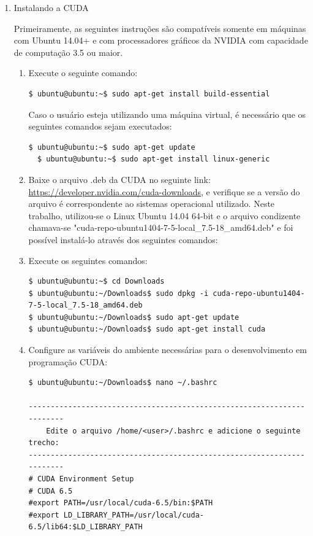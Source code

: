\begin{enumerate}
 \item Instalando a CUDA
 
 Primeiramente, as seguintes instruções são compatíveis somente em máquinas com Ubuntu 14.04+ e com processadores gráficos da NVIDIA com capacidade de computação 3.5 ou maior. 
 \begin{enumerate}
  \item  Execute o seguinte comando:
  
\begin{lstlisting}[basicstyle=\tiny]
  $ ubuntu@ubuntu:~$ sudo apt-­get install build­-essential
\end{lstlisting}
  
Caso o usuário esteja utilizando uma máquina virtual, é necessário que os seguintes comandos sejam executados:

\begin{lstlisting}[basicstyle=\tiny]
  $ ubuntu@ubuntu:~$ sudo apt-get update
  $ ubuntu@ubuntu:~$ sudo apt-get install linux-generic
\end{lstlisting}

\item Baixe o arquivo .deb da CUDA no seguinte link: \url{https://developer.nvidia.com/cuda-downloads}, e verifique se a versão do arquivo é correspondente ao sistemas operacional utilizado. Neste trabalho, utilizou-se o Linux Ubuntu 14.04 64-bit e o arquivo condizente chamava-se "cuda-repo-ubuntu1404-7-5-local\_7.5-18\_amd64.deb" e foi possível instalá-lo através dos seguintes comandos:

\item Execute os seguintes comandos:

\begin{lstlisting}[basicstyle=\tiny]
$ ubuntu@ubuntu:~$ cd Downloads
$ ubuntu@ubuntu:~/Downloads$ sudo dpkg -i cuda-repo-ubuntu1404-7-5-local_7.5-18_amd64.deb
$ ubuntu@ubuntu:~/Downloads$ sudo apt-get update
$ ubuntu@ubuntu:~/Downloads$ sudo apt-get install cuda

\end{lstlisting}

\item Configure as variáveis do ambiente necessárias para o desenvolvimento em programação CUDA:
 
\begin{lstlisting}[basicstyle=\tiny]
$ ubuntu@ubuntu:~/Downloads$ nano ~/.bashrc

-----------------------------------------------------------------------
    Edite o arquivo /home/<user>/.bashrc e adicione o seguinte trecho:
-----------------------------------------------------------------------
# CUDA Environment Setup 
# CUDA 6.5
#export PATH=/usr/local/cuda-6.5/bin:$PATH
#export LD_LIBRARY_PATH=/usr/local/cuda-6.5/lib64:$LD_LIBRARY_PATH


\end{lstlisting}
\end{enumerate}
\end{enumerate}
